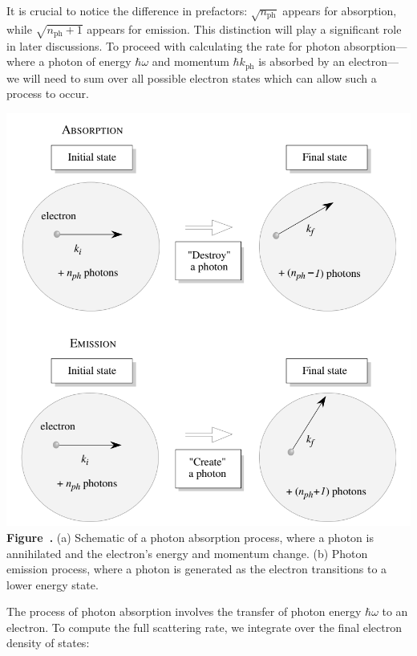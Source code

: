 It is crucial to notice the difference in prefactors: \( \sqrt{n_{\text{ph}}} \) appears for absorption, while \( \sqrt{n_{\text{ph}} + 1} \) appears for emission. This distinction will play a significant role in later discussions.
To proceed with calculating the rate for photon absorption—where a photon of energy \(\hbar \omega\) and momentum \(\hbar k_{\text{ph}}\) is absorbed by an electron—we will need to sum over all possible electron states which can allow such a process to occur.\\
\begin{center}
	\begin{minipage}{0.5\textwidth}
		\centering
		\includegraphics[width=\textwidth]{img/Abs&emiss.png}
		\\[0.5em]
		\textbf{Figure~\thefigure.} (a) Schematic of a photon absorption process, where a photon is annihilated and the electron’s energy and momentum change.
		(b) Photon emission process, where a photon is generated as the electron transitions to a lower energy state.
		\label{fig:Abs&emiss}
	\end{minipage}
\end{center}
The process of photon absorption involves the transfer of photon energy \(\hbar \omega\) to an electron. To compute the full scattering rate, we integrate over the final electron density of states:
